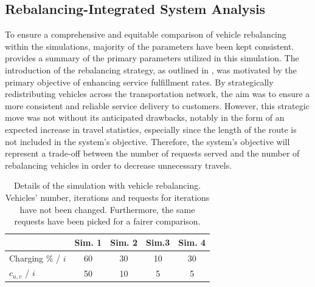 \subsection{Rebalancing-Integrated System Analysis}
To ensure a comprehensive and equitable comparison of vehicle rebalancing within the simulations, majority of the parameters have been kept consistent.  provides a summary of the primary parameters utilized in this simulation. The introduction of the rebalancing strategy, as outlined in , was motivated by the primary objective of enhancing service fulfillment rates. By strategically redistributing vehicles across the transportation network, the aim was to ensure a more consistent and reliable service delivery to customers. However, this strategic move was not without its anticipated drawbacks, notably in the form of an expected increase in travel statistics, especially since the length of the route is not included in the system's objective. Therefore, the system's objective will represent a trade-off between the number of requests served and the number of rebalancing vehicles in order to decrease unnecessary travels. \\
\begin{table}[h]
	\centering
	\begin{tabular}{ |l| c|c|c|c|}
		\hline
		&Sim. 1 & Sim. 2& Sim.3&Sim. 4\\
		\hline
		Charging \% / $i$ & 60&30&10&30\\
		$c_{u,v}$ / $i$ & 50&10&5&5\\
	\end{tabular}
	\caption[Details of the simulation with vehicle rebalancing]{Details of the simulation with vehicle rebalancing. Vehicles' number, iterations and requests for iterations have not been changed. Furthermore, the same requests have been picked for a fairer comparison.}
	\label{tab:rebalancing_with_simu}  
\end{table} 

